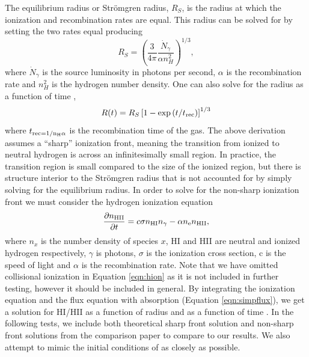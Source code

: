 \documentclass[fleq,usenatbib]{mnras}
\newcommand{\strom}{Str\"omgren}
\begin{document}
The equilibrium radius or \strom{} radius, $R_S$, is the radius at which the 
ionization and recombination rates are equal. This radius can be solved for by 
setting the two rates equal producing \citep[e.g.][]{tielens05}
\begin{equation}
R_S = \left(\frac{3}{4\pi}\frac{\dot{N}_\gamma}{\alpha n^2_{H}}\right)^{1/3},
\end{equation}
where $\dot{N}_\gamma$ is the source luminosity in photons per second, 
$\alpha$ is the recombination rate and $n^2_H$ is the hydrogen number density. 
One can also solve for the radius as a function of time 
\citep[e.g.][]{spitzer78},
\begin{equation}\label{eqn:stromtime}
R(t) = R_S\left[1-\exp\left(t/t_{\rm rec}\right)\right]^{1/3}
\end{equation}
where $t_{\rm rec = 1/{n_H \alpha}}$ is the recombination time of the 
gas. The above derivation assumes a ``sharp'' ionization front, meaning the 
transition from ionized to neutral hydrogen is across an infinitesimally small 
region. In practice, the transition region is small compared to the size of 
the ionized region, but there is structure interior to the \strom{} radius 
that is not accounted for by simply solving for the equilibrium radius. In 
order to solve for the non-sharp ionization front we must consider the 
hydrogen ionization equation
\begin{equation}\label{eqn:hion}
\frac{\partial n_{\rm HII}}{\partial t} = c \sigma n_{\rm HI} n_{\gamma} - 
\alpha n_{\rm e} n_{\rm HII},
\end{equation}
where $n_x$ is the number density of species $x$, HI and HII are neutral 
and ionized hydrogen respectively, $\gamma$ is photons, $\sigma$ is the 
ionization cross section, c is the speed of light and $\alpha$ is the 
recombination rate. Note that we have omitted collisional ionization in 
Equation \ref{eqn:hion} as it is not included in further testing, however it 
should be included in general. By integrating the ionization equation and the 
flux equation with absorption (Equation \ref{eqn:simpflux}), we get a solution 
for HI/HII as a function of radius and as a function of time 
\citep{osterbrockFerland2006}. In the following tests, we include both 
theoretical sharp front solution and non-sharp front solutions from the 
\cite{ilievEt06} comparison paper to compare to our results. We also attempt 
to mimic the initial conditions of \cite{ilievEt06} as closely as possible.
\end{document}
